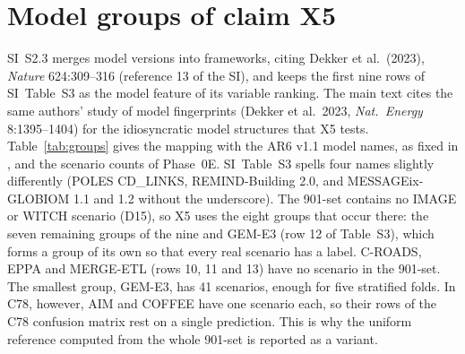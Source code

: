 \documentclass[11pt,a4paper]{article}
\begin{document}
\section{Model groups of claim X5}\label{app:groups}
SI~S2.3 merges model versions into frameworks, citing Dekker et al.\
(2023), \emph{Nature} 624:309--316 (reference 13 of the SI), and keeps the
first nine rows of SI~Table~S3 as the model feature of its variable
ranking. The main text cites the same authors' study of model
fingerprints (Dekker et al.\ 2023, \emph{Nat.\ Energy} 8:1395--1404) for
the idiosyncratic model structures that X5 tests. Table~\ref{tab:groups}
gives the mapping with the AR6 v1.1 model names, as fixed in
, and the scenario counts of Phase~0E.
SI~Table~S3 spells four names slightly differently (POLES CD\_LINKS,
REMIND-Building 2.0, and MESSAGEix-GLOBIOM 1.1 and 1.2 without the
underscore). The 901-set contains no IMAGE or WITCH scenario (D15), so X5
uses the eight groups that occur there: the seven remaining groups of the
nine and GEM-E3 (row 12 of Table~S3), which forms a group of its own so
that every real scenario has a label. C-ROADS, EPPA and MERGE-ETL (rows
10, 11 and 13) have no scenario in the 901-set. The smallest group,
GEM-E3, has 41 scenarios, enough for five stratified folds. In C78,
however, AIM and COFFEE have one scenario each, so their rows of the C78
confusion matrix rest on a single prediction. This is why the uniform
reference computed from the whole 901-set is reported as a variant.
\end{document}
